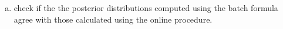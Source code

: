 \documentclass[12pt]{article}
\begin{document}
\begin{enumerate}[(a)]
\begin{itemize}
\begin{itemize}
                \end{itemize}
        \end{itemize}

    \item check if the the posterior distributions computed using the batch
        formula agree with those calculated using the online procedure.

\end{enumerate}
\end{document}
